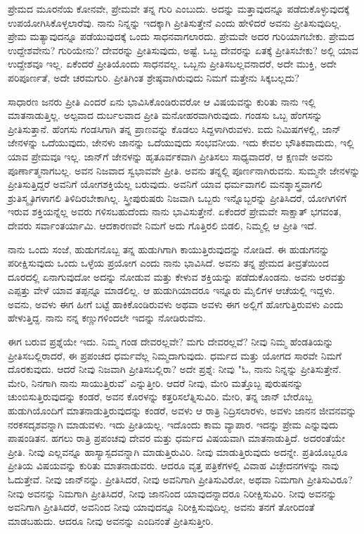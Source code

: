 ಪ್ರೇಮದ ಮೂರನೆಯ ಕೋನವೇ, ಪ್ರೇಮವೇ ತನ್ನ ಗುರಿ ಎಂಬುದು. ಅದನ್ನು ಮತ್ತಾವುದನ್ನೂ ಪಡೆದುಕೊಳ್ಳುವುದಕ್ಕೆ ಉಪಯೋಗಿಸಿಕೊಳ್ಳಲಾರೆವು. ನಾನು ನಿನ್ನನ್ನು ಇದಕ್ಕಾಗಿ ಪ್ರೀತಿಸುತ್ತೇನೆ ಎಂದು ಹೇಳಿದರೆ ಅವನು ಪ್ರೀತಿಸುವುದಿಲ್ಲ. ಪ್ರೇಮ ಮತ್ಯಾವುದನ್ನೂ ಪಡೆಯುವುದಕ್ಕೆ ಒಂದು ಸಾಧನವಾಗಲಾರದು. ಪ್ರೇಮವೇ ಅದರ ಗುರಿಯಾಗಬೇಕು. ಪ್ರೇಮದ ಉದ್ದೇಶವೇನು? ಗುರಿಯೇನು? ದೇವರನ್ನು ಪ್ರೀತಿಸುವುದು, ಅಷ್ಟೆ. ಒಬ್ಬ ದೇವರನ್ನು ಏತಕ್ಕೆ ಪ್ರೀತಿಸಬೇಕು? ಅಲ್ಲಿ ಯಾವ ಉದ್ದೇಶವೂ ಇಲ್ಲ. ಏಕೆಂದರೆ ಪ್ರೀತಿಯೊಂದು ಸಾಧನವಲ್ಲ. ಒಬ್ಬನು ಪ್ರೀತಿಸಬಲ್ಲವನಾದರೆ, ಅದೇ ಮುಕ್ತಿ, ಅದೇ ಪರಿಪೂರ್ಣತೆ, ಅದೇ ಚರಮಗುರಿ. ಪ್ರೀತಿಗಿಂತ ಶ್ರೇಷ್ಠವಾಗಿರುವುದು ನಿಮಗೆ ಮತ್ತೇನು ಸಿಕ್ಕಬಲ್ಲದು?

ಸಾಧಾರಣ ಜನರು ಪ್ರೀತಿ ಎಂದರೆ ಏನು ಭಾವಿಸಿಕೊಂಡಿರುವರೋ ಆ ವಿಷಯವನ್ನು ಕುರಿತು ನಾನು ಇಲ್ಲಿ ಮಾತನಾಡುತ್ತಿಲ್ಲ. ಅಲ್ಪವಾದ ದುರ್ಬಲವಾದ ಪ್ರೀತಿ ಮನೋಹರವಾಗಿರುವುದು. ಗಂಡಸು ಒಬ್ಬ ಹೆಂಗಸನ್ನು ಪ್ರೀತಿಸುತ್ತಾನೆ. ಹೆಂಗಸು ಗಂಡಸಿಗಾಗಿ ತನ್ನ ಪ್ರಾಣವನ್ನು ಕೊಡಲು ಸಿದ್ದಳಾಗಿರುವಳು. ಐದು ನಿಮಿಷಗಳಲ್ಲಿ, ಜಾನ್ ಜೇನಳನ್ನು ಒದೆಯುವುದು, ಜೇನಳು ಜಾನನ್ನು ಒದೆಯುವುದು ಸಂಭವನೀಯ. ಇದು ಕೇವಲ ಭೌತಿಕವಾದುದು, ಇಲ್ಲಿ ಯಾವ ಪ್ರೇಮವೂ ಇಲ್ಲ. ಜಾನ್‌ಗೆ ಜೇನಳನ್ನು ಹೃತೂರ್ವಕವಾಗಿ ಪ್ರೀತಿಸಲು ಸಾಧ್ಯವಾದರೆ, ಆ ಕ್ಷಣವೇ ಅವನು ಪೂರ್ಣಾತ್ಮನಾಗಬಲ್ಲ. ಅವನ ನಿಜವಾದ ಸ್ವಭಾವವೇ ಪ್ರೀತಿ. ಅವನು ತನ್ನಲ್ಲಿ ಪೂರ್ಣನಾಗಿರುವನು. ಸುಮ್ಮನೇ ಜೇನಳನ್ನು ಪ್ರೀತಿಸುತ್ತಿದ್ದರೆ ಅವನಿಗೆ ಯೋಗಶಕ್ತಿಯೆಲ್ಲ ಬರುವುದು. ಅವನಿಗೆ ಯಾವ ಧರ್ಮವಾಗಲಿ ಮನಶ್ಶಾಸ್ತ್ರವಾಗಲಿ ಶ್ರುತಿಸ್ಮೃತಿಗಳಾಗಲಿ ತಿಳಿದಿರಬೇಕಾಗಿಲ್ಲ. ಸ್ತ್ರೀಪುರುಷರು ನಿಜವಾಗಿ ಒಬ್ಬರು ಇನ್ನೊಬ್ಬರನ್ನು ಪ್ರೀತಿಸಿದರೆ, ಯೋಗಿಗಳಿಗೆ ಇರುವ ಶಕ್ತಿಯನ್ನೆಲ್ಲ ಅವರು ಗಳಿಸಬಹುದೆಂದು ನಾನು ಭಾವಿಸುತ್ತೇನೆ. ಏಕೆಂದರೆ ಪ್ರೇಮವೇ ಸಾಕ್ಷಾತ್ ಭಗವಂತ, ದೇವರು ಸರ್ವಾಂತರ್ಯಾಮಿ. ಆದಕಾರಣವೇ ನಿಮಗೆ ಅದು ಗೊತ್ತಿರಲಿ ಬಿಡಲಿ, ನಿಮ್ಮಲ್ಲಿ ಆ ಪ್ರೀತಿ ಇದೆ.

ನಾನು ಒಂದು ಸಂಜೆ, ಹುಡುಗನೊಬ್ಬ ತನ್ನ ಹುಡುಗಿಗಾಗಿ ಕಾಯುತ್ತಿರುವುದನ್ನು ನೋಡಿದೆ. ಈ ಹುಡುಗನನ್ನು ಪರೀಕ್ಷಿಸುವುದು ಒಂದು ಒಳ್ಳೆಯ ಪ್ರಯೋಗ ಎಂದು ನಾನು ಭಾವಿಸಿದೆ. ಅವನು ತನ್ನ ಪ್ರೇಮದ ತೀವ್ರತೆಯಿಂದ ದೂರದಲ್ಲಿ ಏನಾಗುವುದೋ ಅದನ್ನು ನೋಡುವ ಮತ್ತು ಕೇಳುವ ಶಕ್ತಿಯನ್ನು ಪಡೆದುಕೊಂಡನು. ಅವನು ಅರವತ್ತು ಎಪ್ಪತ್ತು ವೇಳೆ ಯಾವ ತಪ್ಪನ್ನೂ ಮಾಡಲಿಲ್ಲ. ಆ ಹುಡುಗಿಯಾದರೂ ಇನ್ನೂರು ಮೈಲಿಗಳ ಆಚೆಯಲ್ಲಿ ಇದ್ದಳು. ಅವನು, ಅವಳು ಈಗ ಹೀಗೆ ಬಟ್ಟೆ ಹಾಕಿಕೊಂಡಿರುವಳು ಅಥವಾ ಅವಳು ಈಗ ಅಲ್ಲಿಗೆ ಹೋಗುತ್ತಿರುವಳು ಎಂದು ಹೇಳುತ್ತಿದ್ದ. ನಾನು ನನ್ನ ಕಣ್ಣುಗಳಿಂದಲೇ ಇದನ್ನು ನೋಡಿರುವೆನು.

ಈಗ ಬರುವ ಪ್ರಶ್ನೆಯೇ ಇದು. ನಿಮ್ಮ ಗಂಡ ದೇವರಲ್ಲವೇ? ಮಗು ದೇವರಲ್ಲವೆ? ನೀವು ನಿಮ್ಮ ಹೆಂಡತಿಯನ್ನು ಪ್ರೀತಿಸಬಲ್ಲಿರಾದರೆ, ಈ ಪ್ರಪಂಚದ ಧರ್ಮವೆಲ್ಲ ನಿಮ್ಮದಾಗುವುದು. ಧರ್ಮದ ಮತ್ತು ಯೋಗದ ಸಾರವೇ ನಿಮಗೆ ದೊರಕುವುದು. ಆದರೆ ನೀವು ನಿಜವಾಗಿ ಪ್ರೀತಿಸಬಲ್ಲಿರಾ? ಅದೇ ಪ್ರಶ್ನೆ: ನೀವು "ಓ, ನಾನು ನಿನ್ನನ್ನು ಪ್ರೀತಿಸುತ್ತೇನೆ. ಮೇರಿ, ನಿನಗಾಗಿ ನಾನು ಸಾಯುತ್ತಿರುವೆ' ಎನ್ನುತ್ತೀರಿ. ಆದರೆ ನೀವು, ಮೇರಿ ಮತ್ತೊಬ್ಬ ಪುರುಷನನ್ನು ಚುಂಬಿಸುತ್ತಿರುವುದನ್ನು ಕಂಡರೆ, ಅವನ ಕೊರಳನ್ನು ಕತ್ತರಿಸಲೆತ್ನಿಸುವಿರಿ. ಮೇರಿ, ತನ್ನ ಜಾನ್ ಬೇರೊಬ್ಬ ಹುಡುಗಿಯೊಂದಿಗೆ ಮಾತನಾಡುತ್ತಿರುವುದನ್ನು ಕಂಡರೆ, ಅವಳು ಆ ರಾತ್ರಿ ನಿದ್ರಿಸಲಾರಳು, ಅವಳು ಜಾನನ ಜೀವನವನ್ನು ನರಕಸದೃಶವನ್ನಾಗಿ ಮಾಡುವಳು. ಇದು ಪ್ರೀತಿಯಲ್ಲ. ಇದೊಂದು ಕಾಮ ವ್ಯಾಪಾರ. ಇದನ್ನು ಪ್ರೇಮ ಎನ್ನುವುದು ಪಾಷಂಡಿತನ. ಹಗಲು ರಾತ್ರಿ ಪ್ರಪಂಚವು ದೇವರ ಮತ್ತು ಧರ್ಮದ ವಿಷಯವಾಗಿ ಮಾತನಾಡುತ್ತಿದೆ. ಅದರಂತೆಯೇ ಪ್ರೀತಿ. ನೀವು ಎಲ್ಲವನ್ನೂ ಹಾಸ್ಯಾಸ್ಪದವನ್ನಾಗಿ ಮಾಡುತ್ತಿರುವಿರಿ. ನೀವು ಮಾಡುತ್ತಿರುವುದು ಅದನ್ನೇ. ಪ್ರತಿಯೊಬ್ಬರೂ ಪ್ರೀತಿಯ ವಿಷಯವನ್ನು ಕುರಿತು ಮಾತನಾಡುವರು. ಆದರೂ ವೃತ್ತ ಪತ್ರಿಕೆಗಳಲ್ಲಿ ವಿವಾಹ ವಿಚ್ಛೇದನಗಳನ್ನು ನಾವು ಓದುತ್ತೇವೆ. ನೀವು ಜಾನ್‌ನನ್ನು. ಪ್ರೀತಿಸಿದರೆ, ನೀವು ಅವನಿಗಾಗಿ ಪ್ರೀತಿಸುವಿರೋ, ಅಥವಾ ನಿಮಗಾಗಿ ಪ್ರೀತಿಸುವಿರೂ? ನೀವು ಅವನನ್ನು ನಿಮಗಾಗಿ ಪ್ರೀತಿಸಿದರೆ, ನೀವು ಜಾನನಿಂದ ಯಾವುದನ್ನಾದರೂ ನಿರೀಕ್ಷಿಸುವಿರಿ. ನೀವು ಅವನನ್ನು ಅವನಿಗಾಗಿ ಪ್ರೀತಿಸಿದರೆ, ಅವನಿಂದ ನೀವು ಯಾವುದನ್ನೂ ನಿರೀಕ್ಷಿಸುವುದಿಲ್ಲ. ಅವನು ತನಗೆ ತೋರಿದಂತೆ ಮಾಡಬಹುದು. ಆದರೂ ನೀವು ಅವನನ್ನು ಎಂದಿನಂತೆ ಪ್ರೀತಿಸುತ್ತೀರಿ.

